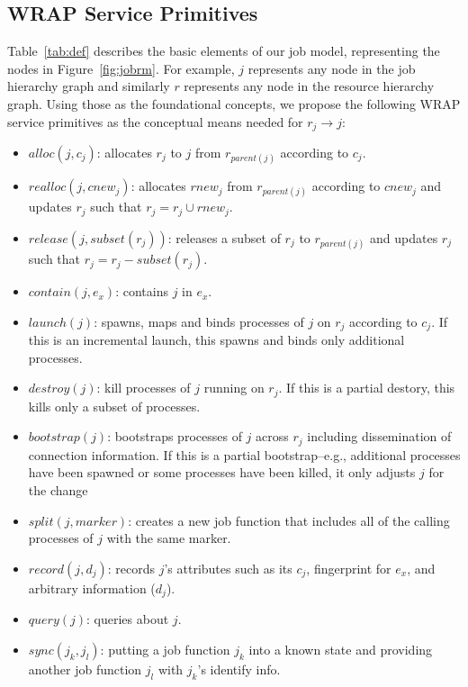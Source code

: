 \documentclass[10pt]{article}
\begin{document}
\subsection{WRAP Service Primitives}
\label{sect:prim}

Table~\ref{tab:def} describes the basic elements of our job model, representing 
the nodes in Figure~\ref{fig:jobrm}. For example, $j$ represents any node 
in the job hierarchy graph and similarly $r$ represents any node in the resource hierarchy graph.
Using those as the foundational concepts, we propose 
the following WRAP service primitives as the conceptual means 
needed for $r_j \rightarrow j$: 

\begin{itemize}

\item{$alloc(j, c_j)$: allocates $r_j$ to $j$ from $r_{parent(j)}$ according to $c_j$.}

\item{$realloc(j, cnew_j)$: allocates $rnew_j$ from $r_{parent(j)}$ according to $cnew_j$ and updates $r_j$ such that $r_j = r_j \cup rnew_j$.} 

\item{$release(j, subset(r_j))$: releases a subset of $r_j$ to $r_{parent(j)}$ and updates $r_j$ such that $r_j = r_j - subset(r_j)$.}

\item{$contain(j, e_x)$: contains $j$ in $e_x$.}

\item{$launch(j)$: spawns, maps and binds processes of $j$ on $r_j$ according to $c_j$. If this is an incremental launch, this spawns and binds only additional processes.}

\item{$destroy(j)$: kill processes of $j$ running on $r_j$. If this is a partial destory, this kills only a subset of processes.}

\item{$bootstrap(j)$: bootstraps processes of $j$ across $r_j$ including dissemination of connection information. If this is a partial bootstrap--e.g., additional processes have been spawned or some processes have been killed, it only adjusts $j$ for the change}

\item{$split(j, marker)$: creates a new job function that includes all of the calling processes of $j$ with the same marker.} 

\item{$record(j, d_j)$: records $j$'s attributes such as its $c_j$, fingerprint for $e_x$, and arbitrary information ($d_j$).}

\item{$query(j)$: queries about $j$.}

\item{$sync(j_k, j_l)$: putting a job function $j_k$ into a known state and providing another job function $j_l$ with $j_k$'s identify info.}

\end{itemize}
\end{document}
